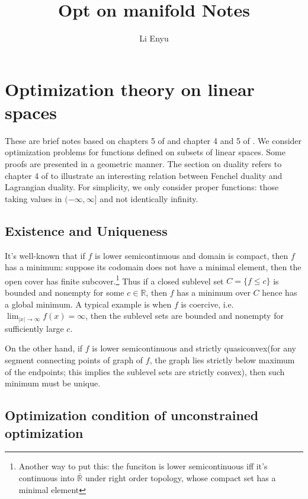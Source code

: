 \documentclass[a4paper]{mynotes}
\title{{\bfseries{Opt on manifold Notes}}}
\author{{{Li Enyu}}}
\date{}
\begin{document}
\maketitle

\tableofcontents

\chapter{Optimization theory on linear spaces}
These are brief notes based on chapters 5 of \cite{optmodel} and chapter 4 and 5 of \cite{boyd}. We consider optimization problems for functions defined on subsets of linear spaces. Some proofs are presented in a geometric manner. The section on duality refers to chapter 4 of \cite{du} to illustrate an interesting relation between Fenchel duality and Lagrangian duality. For simplicity, we only consider proper functions: those taking values in $(-\infty, \infty]$ and not identically infinity. 


\section{Existence and Uniqueness}

It's well-known that if $f$ is lower semicontinuous and domain is compact, then $f$ has a minimum: suppose its codomain does not have a minimal element, then the open cover\gs{\hk{f^{-1}(f(x),\infty]}} has finite subcover.\footnote{ Another way to put this: the funciton is lower semicontinuous iff it's continuous into $ \bar{\mathbb R}$ under right order topology, whose compact set has a minimal element} Thus if a closed  sublevel set $C=\{f\le c\}$ is bounded and nonempty for some $c\in \mathbb{R}$, then $f$ has a minimum over $C$ hence has a global minimum. A typical example is when $f$ is coercive, i.e. $\lim_{|x|\to\infty}f(x)=\infty$, then the sublevel sets are bounded and nonempty for sufficiently large $c$.

On the other hand, if $f$ is lower semicontinuous and strictly quasiconvex(for any segment connecting points of graph of $f$, the graph lies strictly below maximum of the endpoints; this implies the sublevel sets are strictly convex), then such minimum must be unique.


\section{Optimization condition of unconstrained optimization}
\def\hess{\mathrm{Hess}}
\end{document}
